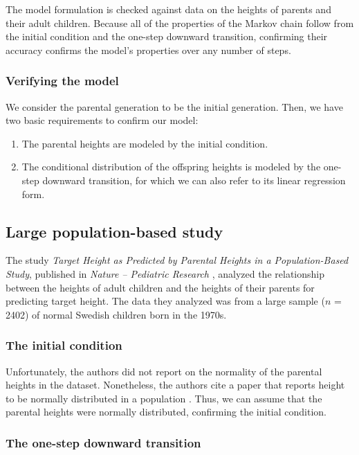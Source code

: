 \documentclass[letterpaper,10pt]{article} %
\begin{document}
The model formulation is checked against data on the heights of parents and their adult children. Because all of the properties of the Markov chain follow from the initial condition and the one-step downward transition, confirming their accuracy confirms the model's properties over any number of steps.

\subsubsection*{Verifying the model}
We consider the parental generation to be the initial generation. Then, we have two basic requirements to confirm our model:
\begin{enumerate}
\item The parental heights are modeled by the initial condition.
\item The conditional distribution of the offspring heights is modeled by the one-step downward transition, for which we can also refer to its linear regression form.
\end{enumerate}



\subsection{Large population-based study}

The study \emph{Target Height as Predicted by Parental Heights in a Population-Based Study}, published in \emph{Nature -- Pediatric Research} \cite{luo}, analyzed the relationship between the heights of adult children and the heights of their parents for predicting target height. The data they analyzed was from a large sample ($n$ = 2402) of normal Swedish children born in the 1970s. 


\subsubsection*{The initial condition}
Unfortunately, the authors did not report on the normality of the parental heights in the dataset. Nonetheless, the authors cite a paper that reports height to be normally distributed in a population \cite{preece}. Thus, we can assume that the parental heights were normally distributed, confirming the initial condition.


\subsubsection*{The one-step downward transition}
\end{document}
